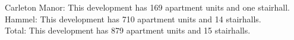 {Carleton Manor}: This development has 169 apartment units and one stairhall.\\{Hammel}: This development has 710 apartment units and 14 stairhalls.\\{Total}: This development has 879 apartment units and 15 stairhalls.\\